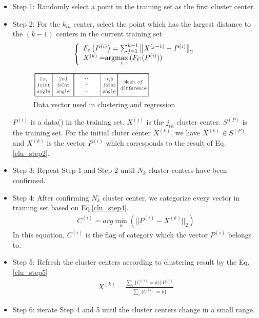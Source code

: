 \begin{itemize}
	\item Step 1: Randomly select a point in the training set as the first cluster center.
	\item Step 2: For the $k_{th}$ center, select the point which has the largest  distance to the $(k-1)$ centers in the current training set
	\begin{eqnarray}\label{clu_step2}
	\left\{
	\begin{array}{lr}
	F_{c}\left ( P^{\left (  i\right )} \right ) = \sum_{j=1}^{k-1}\left \| X^{\left ( j-1 \right )}-P^{\left (  i\right )} \right \|_{2}\\
	X^{(k)} = $arg$\max \limits_{i}{(F_{C}(P^{(i)}))}
	\end{array}
	\right.
	\end{eqnarray}
	\begin{figure}[H]
		\centering
		\includegraphics[height=0.5in]{fig/mainwork/data2}
		\caption{Data vector used in clustering and regression}
	\end{figure}
	$P^{(i)}$ is a data() in the training set. $X^{(j)}$ is the $j_{th}$ cluster center. $S^{(P)}$ is the  training set. For the initial cluter center $X^{(k)}$, we have $X^{(k)}\in S^{(P)}$ and $X^{(k)}$ is the vector $P^{(i)}$ which corresponds to the result of Eq.\ref{clu_step2}. 
	\item Step 3: Repeat Step 1 and Step 2 until $N_{k}$ cluster centers have been confirmed.
	\item Step 4: After confirming $N_{k}$ cluster center, we categorize every vector in training set based on Eq.\ref{clu_step4}.
	\begin{eqnarray}\label{clu_step4}
	C^{(i)} = arg\min \limits_{k}{(||P^{(i)}-X^{(k)}||_{2})}
	\end{eqnarray}
	In this equation, $C^{(i)}$ is the flag of category which the vector $P^{(i)}$ belongs to.
	\item Step 5: Refresh the cluster centers according to clustering result by the Eq.\ref{clu_step5}
	\begin{eqnarray}\label{clu_step5}
	X^{(k)}=\frac{\sum_{i}\{C^{(i)}=k)\}P^{(i)}}{\sum_{i}\{C^{(i)}=k\}}
	\end{eqnarray}
	\item Step 6: iterate Step 4 and 5 until the cluster centers change in a small range.
\end{itemize}

